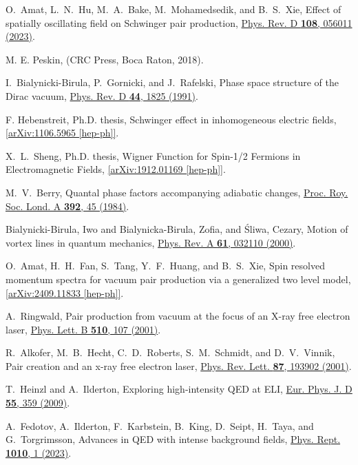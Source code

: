 \documentclass[prl,twocolumn,floatfix,amsmath,nofootinbib,superscriptaddress,amssymb,preprintnumbers,floatfix]{revtex4-1}
\begin{document}
\begin{thebibliography}{apsrev4-1}
O.~Amat, L.~N.~Hu, M.~A.~Bake, M.~Mohamedsedik, and B.~S.~Xie,
Effect of spatially oscillating field on Schwinger pair production,
\href{https://journals.aps.org/prd/pdf/10.1103/PhysRevD.108.056011}{Phys. Rev. D \textbf{108}, 056011 (2023)}.

M. E. Peskin,
 (CRC Press, Boca Raton, 2018).

I.~Bialynicki-Birula, P.~Gornicki, and J.~Rafelski,
Phase space structure of the Dirac vacuum,
\href{https://journals.aps.org/prd/pdf/10.1103/PhysRevD.44.1825}{Phys. Rev. D \textbf{44}, 1825 (1991)}.

F. Hebenstreit, Ph.D. thesis,
Schwinger effect in inhomogeneous electric fields,
\href{https://arxiv.org/pdf/1106.5965}{[arXiv:1106.5965 [hep-ph]]}.

X.~L.~Sheng, Ph.D. thesis,
Wigner Function for Spin-1/2 Fermions in Electromagnetic Fields,
\href{https://arxiv.org/pdf/1912.01169}{[arXiv:1912.01169 [hep-ph]]}.

M.~V.~Berry,
Quantal phase factors accompanying adiabatic changes,
\href{https://royalsocietypublishing.org/doi/10.1098/rspa.1984.0023}{Proc. Roy. Soc. Lond. A \textbf{392}, 45 (1984)}.

Bialynicki-Birula, Iwo and Bialynicka-Birula, Zofia, and \ifmmode {}\else \'{S}\fi{}liwa, Cezary,
Motion of vortex lines in quantum mechanics,
\href{https://journals.aps.org/pra/abstract/10.1103/PhysRevA.61.032110}{Phys. Rev. A \textbf{61}, 032110 (2000)}.

O.~Amat, H.~H.~Fan, S.~Tang, Y.~F.~Huang, and B.~S.~Xie,
Spin resolved momentum spectra for vacuum pair production via a generalized two level model,
\href{https://arxiv.org/pdf/2409.11833}{[arXiv:2409.11833 [hep-ph]]}.

A.~Ringwald,
Pair production from vacuum at the focus of an X-ray free electron laser,
\href{https://www.sciencedirect.com/science/article/pii/S0370269301004968}{Phys. Lett. B \textbf{510}, 107 (2001)}.

R.~Alkofer, M.~B.~Hecht, C.~D.~Roberts, S.~M.~Schmidt, and D.~V.~Vinnik,
Pair creation and an x-ray free electron laser,
\href{https://journals.aps.org/prl/abstract/10.1103/PhysRevLett.87.193902}{Phys. Rev. Lett. \textbf{87}, 193902 (2001)}.

T.~Heinzl and A.~Ilderton,
Exploring high-intensity QED at ELI,
\href{https://link.springer.com/article/10.1140/epjd/e2009-00113-x}{Eur. Phys. J. D \textbf{55}, 359 (2009)}.

A.~Fedotov, A.~Ilderton, F.~Karbstein, B.~King, D.~Seipt, H.~Taya, and G.~Torgrimsson,
Advances in QED with intense background fields,
\href{https://www.sciencedirect.com/science/article/pii/S0370157323000352?via%3Dihub}{Phys. Rept. \textbf{1010}, 1 (2023)}.


\end{thebibliography}
\end{document}
